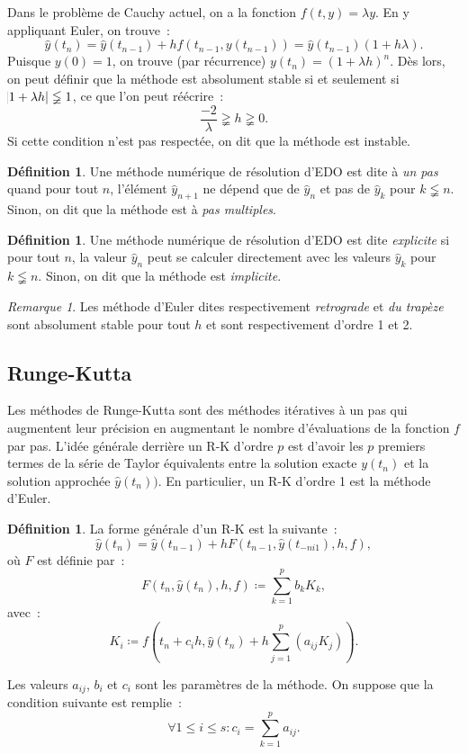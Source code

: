 \documentclass{article}
\theoremstyle{definition}
\newtheorem{déf}[thm]{Définition}
\theoremstyle{remark}
\newtheorem*{rmq}{Remarque}
\begin{document}
		Dans le problème de Cauchy actuel, on a la fonction $f(t, y) = \lambda y$. En y appliquant Euler, on trouve~:
		\[\widehat y(t_n) = \widehat y(t_{n-1}) + hf(t_{n-1}, y(t_{n-1})) = \widehat y(t_{n-1})(1 + h\lambda).\]
		Puisque $y(0) = 1$, on trouve (par récurrence) $y(t_n) = (1 + \lambda h)^n$. Dès lors, on peut définir que la méthode est absolument stable si et
		seulement si $\abs{1 + \lambda h} \lneqq 1$, ce que l'on peut réécrire~:
		\[\frac {-2}\lambda \gneqq h \gneqq 0.\]
		Si cette condition n'est pas respectée, on dit que la méthode est instable.

		\begin{déf} Une méthode numérique de résolution d'EDO est dite à \emph{un pas} quand pour tout $n$, l'élément $\widehat y_{n+1}$ ne dépend que de
		$\widehat y_n$ et pas de $\widehat y_k$ pour $k \lneqq n$. Sinon, on dit que la méthode est à \emph{pas multiples}.
		\end{déf}

		\begin{déf} Une méthode numérique de résolution d'EDO est dite \emph{explicite} si pour tout $n$, la valeur $\widehat y_n$ peut se calculer directement
		avec les valeurs $\widehat y_k$ pour $k \lneqq n$. Sinon, on dit que la méthode est \emph{implicite}.
		\end{déf}

		\begin{rmq} Les méthode d'Euler dites respectivement \emph{retrograde} et \emph{du trapèze} sont absolument stable pour tout $h$ et sont respectivement
		d'ordre 1 et 2.
		\end{rmq}

	\subsection{Runge-Kutta}
		Les méthodes de Runge-Kutta sont des méthodes itératives à un pas qui augmentent leur précision en augmentant le nombre d'évaluations de la fonction $f$
		par pas. L'idée générale derrière un R-K d'ordre $p$ est d'avoir les $p$ premiers termes de la série de Taylor équivalents entre la solution exacte
		$y(t_n)$ et la solution approchée $\widehat y(t_n))$. En particulier, un R-K d'ordre 1 est la méthode d'Euler.

		\begin{déf} La forme générale d'un R-K est la suivante~:
		\[\widehat y(t_n) = \widehat y(t_{n-1}) + hF\left(t_{n-1}, \widehat y(t_{-ni1}), h, f\right),\]
		où $F$ est définie par~:
		\[F\left(t_n, \widehat y(t_n), h, f\right) \coloneqq \sum_{k=1}^pb_kK_k,\]
		avec~:
		\[K_i \coloneqq f\left(t_n + c_ih, \widehat y(t_n) + h\sum_{j=1}^p(a_{ij}K_j)\right).\]

		Les valeurs $a_{ij}$, $b_i$ et $c_i$ sont les paramètres de la méthode. On suppose que la condition suivante est remplie~:
		\[\forall 1 \leq i \leq s : c_i = \sum_{k=1}^pa_{ij}.\]
		\end{déf}
\end{document}
